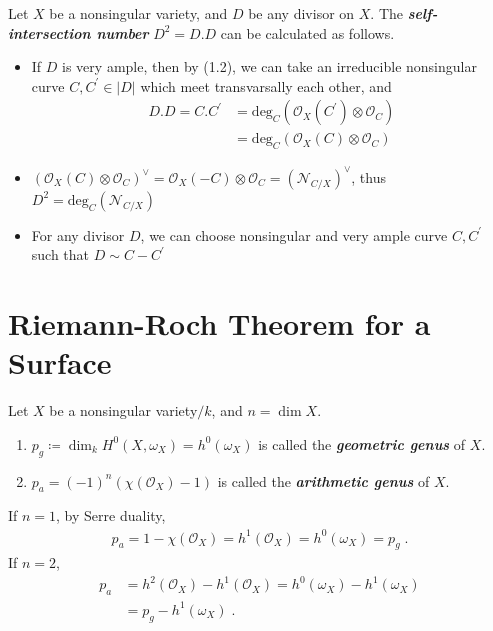 \documentclass[a4paper, eqnumbering=section, thmnumbering=section, 10pt]{simple-eng}
\begin{document}
\begin{example}{}{}
    Let $X$ be a nonsingular variety, and $D$ be any divisor on $X$. The 
    \textbf{\textit{self-intersection number}}
    $D^2=D.D$ can be calculated as follows.\par
    \begin{itemize}
        \item If $D$ is very ample, then by (1.2), we can take an irreducible nonsingular curve 
            $C,C^\prime \in \left\lvert D \right\rvert $ which meet transvarsally each other, and
            \begin{align}
                D.D = C.C^\prime &=\text{deg}_C(\mathscr{O}_X(C^\prime)\otimes \mathscr{O}_C)\\
                &= \text{deg}_C(\mathscr{O}_X(C)\otimes \mathscr{O}_C)
            \end{align}
        \item $(\mathscr{O}_X(C)\otimes \mathscr{O}_C)^{\vee } = 
            \mathscr{O}_X(-C)\otimes \mathscr{O}_C = (\mathscr{N}_{C/X})^{\vee}$, thus $D^2 = \text{deg}_C(\mathscr{N}_{C/X})$
        \item For any divisor $D$, we can choose nonsingular and very ample curve $C,C^\prime$ such that 
            $D \sim C-C^\prime $
    \end{itemize}
\end{example}

\section{Riemann-Roch Theorem for a Surface}

\begin{definition}{}{}
    Let $X$ be a nonsingular variety$/k$, and $n=\dim X$.
    \begin{enumerate}[label=(\arabic*{})]
        \item $p_g \coloneqq \dim_k H^0(X,\omega_X) = h^0(\omega_X)$ is called the 
            \textbf{\textit{geometric genus}} of $X$.
        \item $p_a = (-1)^n (\chi(\mathscr{O}_X) - 1)$ is called the \textbf{\textit{arithmetic genus}} of $X$.
    \end{enumerate}
    If $n=1$, by Serre duality, 
    \begin{align}
        p_a = 1-\chi(\mathscr{O}_X) = h^1(\mathscr{O}_X) = h^0(\omega_X) = p_g \; . 
    \end{align}
    If $n=2$, 
    \begin{align}
        p_a &= h^2(\mathscr{O}_X)- h^1(\mathscr{O}_X) = h^0(\omega_X) - h^1(\omega_X) \\
        &= p_g - h^1(\omega_X)\;. 
    \end{align}
\end{definition}
\end{document}

